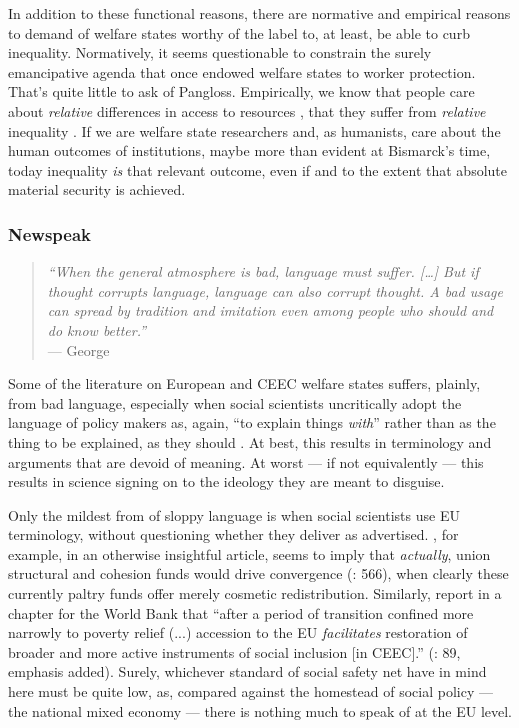 \documentclass[11pt,a4paper,oneside,openright]{article}
\begin{document}
\begin{enumerate}
	In addition to these functional reasons, there are normative and empirical reasons to demand of welfare states worthy of the label to, at least, be able to curb inequality. Normatively, it seems questionable to constrain the surely emancipative agenda that once endowed welfare states to worker protection. That's quite little to ask of Pangloss. Empirically, we know that people care about \emph{relative} differences in access to resources \citep{Frank2005}, that they suffer from \emph{relative} inequality \citep{Pickett-2009-kx}. If we are welfare state researchers and, as humanists, care about the human outcomes of institutions, maybe more than evident at Bismarck's time, today inequality \emph{is} that relevant outcome, even if and to the extent that absolute material security is achieved.
\end{enumerate}

\subsubsection[Newspeak]{Newspeak} \label{sec:newspeak}

\begin{quote}
	\emph{``When the general atmosphere is bad, language must suffer. [\ldots] But if thought corrupts language, language can also corrupt thought. A bad usage can spread by tradition and imitation even among people who should and do know better.''}\\
	--- George \citealt{Orwell1946}
\end{quote}

Some of the literature on European and \gls{CEEC} welfare states suffers, plainly, from bad language, especially when social scientists uncritically adopt the language of policy makers as, again, ``to explain things \emph{with}'' rather than as the thing to be explained, as they should \citep{Brubaker-2002-aa}. At best, this results in terminology and arguments that are devoid of meaning. At worst --- if not equivalently --- this results in science signing on to the ideology they are meant to disguise.

Only the mildest from of sloppy language is when social scientists use \gls{EU} terminology, without questioning whether they deliver as advertised. \citeauthor{Dehey2003}, for example, in an otherwise insightful article, seems to imply that \emph{actually}, union structural and cohesion funds would drive convergence (\citeyear{Dehey2003}: 566), when clearly these currently paltry funds offer merely cosmetic redistribution. Similarly, \citeauthor{Sipos2005} report in a chapter for the World Bank that ``after a period of transition confined more narrowly to poverty relief (...) accession to the \gls{EU} \emph{facilitates} restoration of broader and more active instruments of social inclusion [in \gls{CEEC}].'' (\citeyear{Sipos2005}: 89, emphasis added). Surely, whichever standard \citeauthor{Sipos2005} of social safety net have in mind here must be quite low, as, compared against the homestead of social policy --- the national mixed economy --- there is nothing much to speak of at the \gls{EU} level.
\end{document}
